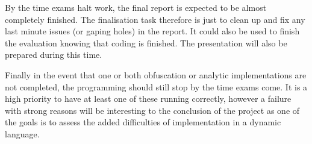 \documentclass{report}
\begin{document}
By the time exams halt work, the final report is expected to be almost completely finished. The finalisation task therefore is just to
clean up and fix any last minute issues (or gaping holes) in the report. It could also be used to finish the evaluation knowing that
coding is finished. The presentation will also be prepared during this time.

Finally in the event that one or both obfuscation or analytic implementations are not completed, the programming should still stop
by the time exams come. It is a high priority to have at least one of these running correctly, however a failure with strong reasons
will be interesting to the conclusion of the project as one of the goals is to assess the added difficulties of implementation in
a dynamic language.



\end{document}
